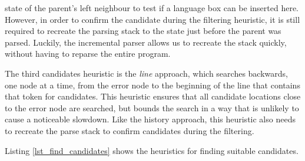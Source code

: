 \documentclass[sigplan,screen]{acmart}\settopmatter{printfolios=true,printccs=false,printacmref=false}
\begin{document}
state of the parent's left neighbour to test if a language box can be inserted
here. However, in order to confirm the candidate during the filtering
heuristic, it is still required to recreate the parsing stack to the state just
before the parent was parsed. Luckily, the incremental parser allows us to recreate
the stack quickly, without having to reparse the entire program.

The third candidates heuristic is the \emph{line} approach, which searches
backwards, one node at a time, from the error node to the beginning of the line
that contains that token for candidates. This heuristic ensures that all
candidate locations close to the error node are searched, but bounds the search
in a way that is unlikely to cause a noticeable slowdown. Like the history
approach, this heuristic also needs to recreate the parse stack to confirm
candidates during the filtering.

Listing \ref{lst_find_candidates} shows the heuristics for finding suitable
candidates.
\end{document}

